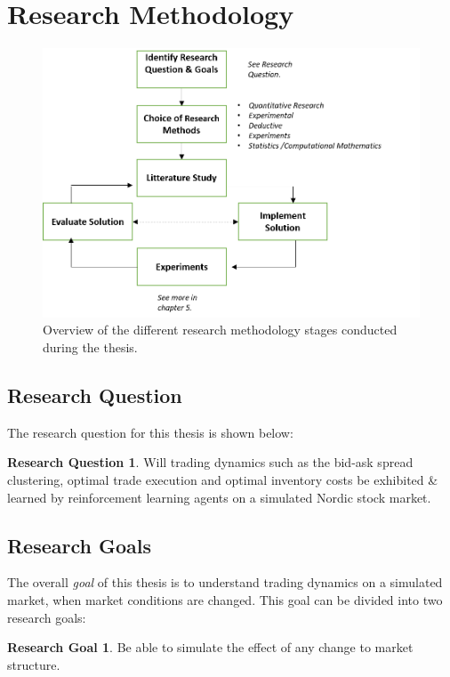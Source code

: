 \documentclass{kththesis}
\theoremstyle{definition}
\newtheorem{RQ}{Research Question}[section]
\newtheorem{RG}{Research Goal}[section]
\begin{document}
\section{Research Methodology}
\begin{figure}[H]
    \centering
    \includegraphics[scale=.8]{Imgs/researchmethodsv3.PNG}
    \caption{Overview of the different research methodology stages conducted during the thesis.}
    \label{fig:r1}
\end{figure}

\subsection{Research Question}
The research question for this thesis is shown below:

\begin{RQ}
Will trading dynamics such as the bid-ask spread clustering, optimal trade execution and optimal inventory costs be exhibited \& learned by reinforcement learning agents on a simulated Nordic stock market.
\end{RQ}

\subsection{Research Goals}
The overall \textit{goal} of this thesis is to understand trading dynamics on a simulated market, when market conditions are changed. This goal can be divided into two research goals:

\begin{RG}
Be able to simulate the effect of any change to market structure.
\end{RG}
\end{document}
